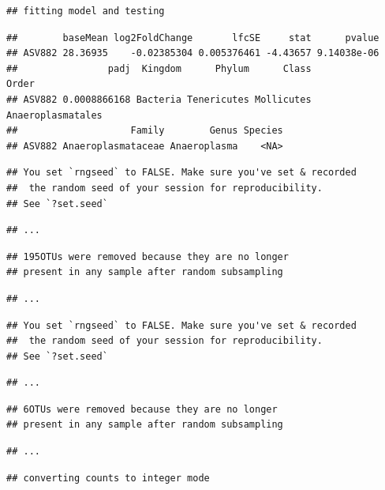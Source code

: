 \documentclass[]{article}
\begin{document}
\begin{verbatim}
## fitting model and testing
\end{verbatim}

\begin{verbatim}
##        baseMean log2FoldChange       lfcSE     stat      pvalue
## ASV882 28.36935    -0.02385304 0.005376461 -4.43657 9.14038e-06
##                padj  Kingdom      Phylum      Class             Order
## ASV882 0.0008866168 Bacteria Tenericutes Mollicutes Anaeroplasmatales
##                    Family        Genus Species
## ASV882 Anaeroplasmataceae Anaeroplasma    <NA>
\end{verbatim}

\begin{verbatim}
## You set `rngseed` to FALSE. Make sure you've set & recorded
##  the random seed of your session for reproducibility.
## See `?set.seed`
\end{verbatim}

\begin{verbatim}
## ...
\end{verbatim}

\begin{verbatim}
## 195OTUs were removed because they are no longer 
## present in any sample after random subsampling
\end{verbatim}

\begin{verbatim}
## ...
\end{verbatim}

\begin{verbatim}
## You set `rngseed` to FALSE. Make sure you've set & recorded
##  the random seed of your session for reproducibility.
## See `?set.seed`
\end{verbatim}

\begin{verbatim}
## ...
\end{verbatim}

\begin{verbatim}
## 6OTUs were removed because they are no longer 
## present in any sample after random subsampling
\end{verbatim}

\begin{verbatim}
## ...
\end{verbatim}

\begin{verbatim}
## converting counts to integer mode
\end{verbatim}
\end{document}
